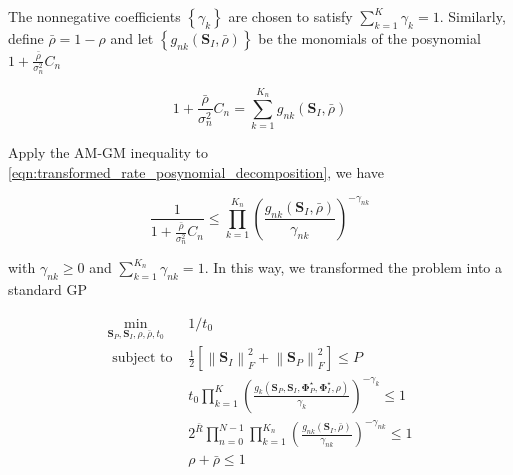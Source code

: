 The nonnegative coefficients $\left\{ {{\gamma _k}} \right\}$ are chosen to satisfy $\sum\nolimits_{k = 1}^K {{\gamma _k}}  = 1$. Similarly, define $\bar \rho  = 1 - \rho $ and let $\left\{ {{g_{nk}}\left( {{{\mathbf{S}}_I},\bar \rho } \right)} \right\}$ be the monomials of the posynomial $1 + \frac{{\bar \rho }}{{\sigma _n^2}}{C_n}$

\begin{equation}\label{eqn:transformed_rate_posynomial_decomposition}
  1 + \frac{{\bar \rho }}{{\sigma _n^2}}{C_n} = \sum\limits_{k = 1}^{{K_n}} {{g_{nk}}} \left( {{{\mathbf{S}}_I},\bar \rho } \right)
\end{equation}

Apply the AM-GM inequality to \ref{eqn:transformed_rate_posynomial_decomposition}, we have

\begin{equation}\label{eqn:transformed_rate_am_gm}
  \frac{1}{{1 + \frac{{\bar \rho }}{{\sigma _n^2}}{C_n}}} \leqslant \prod\limits_{k = 1}^{{K_n}} {{{\left( {\frac{{{g_{nk}}\left( {{{\mathbf{S}}_I},\bar \rho } \right)}}{{{\gamma _{nk}}}}} \right)}^{ - {\gamma _{nk}}}}}
\end{equation}

with ${\gamma _{nk}} \geqslant 0$ and $\sum\nolimits_{k = 1}^{{K_n}} {{\gamma _{nk}}}  = 1$. In this way, we transformed the problem into a standard GP

\begin{eqnarray}
  {\mathop {\min }\limits_{{{\mathbf{S}}_P},{{\mathbf{S}}_I},\rho ,\bar \rho ,{t_0}} }&{1/{t_0}} \label{eqn:general_target} \\
  {{\text{ subject to }}}&{\frac{1}{2}\left[ {\left\| {{{\mathbf{S}}_I}} \right\|_F^2 + \left\| {{{\mathbf{S}}_P}} \right\|_F^2} \right] \leqslant P} \label{eqn:general_power_constraint} \\
  {}&{{t_0}\prod\limits_{k = 1}^K {{{\left( {\frac{{{g_k}\left( {{{\mathbf{S}}_P},{{\mathbf{S}}_I},{\mathbf{\Phi }}_P^ \star ,{\mathbf{\Phi }}_I^ \star ,\rho } \right)}}{{{\gamma _k}}}} \right)}^{ - {\gamma _k}}}}  \leqslant 1} \label{eqn:general_current_constraint} \\
  {}&{2^{\bar R}}\prod\limits_{n = 0}^{N - 1} {\prod\limits_{k = 1}^{{K_n}} {{{\left( {\frac{{{g_{nk}}\left( {{{\mathbf{S}}_I},\bar \rho } \right)}}{{{\gamma _{nk}}}}} \right)}^{ - {\gamma _{nk}}}}} }  \leqslant 1 \label{eqn:general_rate_constraint} \\
  {}&{\rho  + \bar \rho  \leqslant 1} \label{eqn:general_ratio_constraint}
\end{eqnarray}

